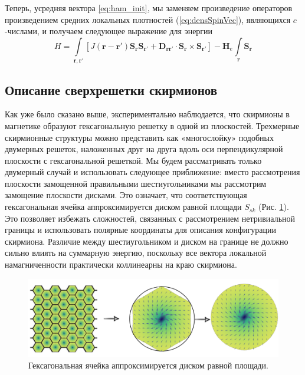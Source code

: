 \documentclass[a4paper,article,14pt]{extarticle}
\begin{document}
Теперь, усредняя вектора \eqref{eq:ham_init}, мы заменяем произведение операторов произведением средних локальных плотностей (\ref{eq:densSpinVec}), являющихся $c$-числами, и получаем следующее выражение для энергии
\begin{equation}
\label{eq:ham}	
H = \int\limits_{\mathbf{r}, \mathbf{r}'} \left[ J\left( \mathbf{r} - \mathbf{r}' \right)\mathbf{S}_{\mathbf{r}} \mathbf{S}_{\mathbf{r}'} + {{\mathbf{D}}_{\mathbf{r} \mathbf{r}'}} \cdot \mathbf{S}_{\mathbf{r}} \times \mathbf{S}_{\mathbf{r}'} \right] -  \mathbf{H}_e  \int\limits_{\mathbf{r}}\mathbf{S}_{\mathbf{r}}
\end{equation}

\subsection{Описание сверхрешетки скирмионов}
Как уже было сказано выше, экспериментально наблюдается, что скирмионы в магнетике образуют гексагональную решетку в одной из плоскостей. \cite{mulhbauer, yu} Трехмерные скирмионные структуры можно представить как «многослойку» подобных двумерных решеток, наложенных друг на друга вдоль оси перпендикулярной плоскости с гексагональной решеткой. Мы будем рассматривать только двумерный случай и использовать следующее приближение: вместо рассмотрения плоскости замощенной правильными шестиугольниками мы рассмотрим замощение плоскости дисками. Это означает, что соответствующая гексагональная ячейка аппроксимируется диском равной площади $S_{sk}$ (Рис. \ref{pic:approxHexagone}). Это позволяет избежать сложностей, связанных с рассмотрением нетривиальной границы и использовать полярные координаты для описания конфигурации скирмиона. Различие между шестиугольником и диском на границе не должно сильно влиять на суммарную энергию, поскольку все вектора локальной намагниченности практически коллинеарны на краю скирмиона.

\begin{figure}[h]
\centering
\includegraphics[width=0.5\paperwidth]{images/approx.png}
\caption{Гексагональная ячейка аппроксимируется диском равной площади.}
\label{pic:approxHexagone}
\end{figure}
\end{document}
